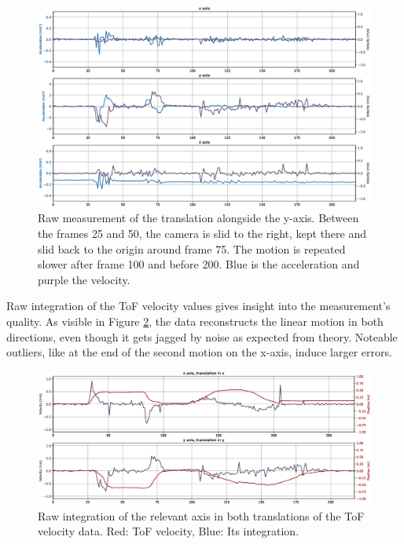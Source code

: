 \begin{figure}[H]
  \centering
  \includegraphics[width=1.0\textwidth]{images/tof_translation_measurement_y.eps}
  \caption{Raw measurement of the translation alongside the y-axis. Between the frames 25 and 50, the camera is slid to the right, kept there and slid back to the origin around frame 75. The motion is repeated slower after frame 100 and before 200. Blue is the acceleration and purple the velocity.}
  \label{im:tof_translation_measurement_y}
\end{figure}
Raw integration of the ToF velocity values gives insight into the measurement's quality. As visible in Figure \ref{im:tof_translation_measurement_integrated}, the data reconstructs the linear motion in both directions, even though it gets jagged by noise as expected from theory. Noteable outliers, like at the end of the second motion on the x-axis, induce larger errors. 
\begin{figure}[H]
  \centering
  \includegraphics[width=1.0\textwidth]{images/tof_translation_measurement_integrated.eps}
  \caption{Raw integration of the relevant axis in both translations of the ToF velocity data. Red: ToF velocity, Blue: Its integration.}
  \label{im:tof_translation_measurement_integrated}
\end{figure} 
